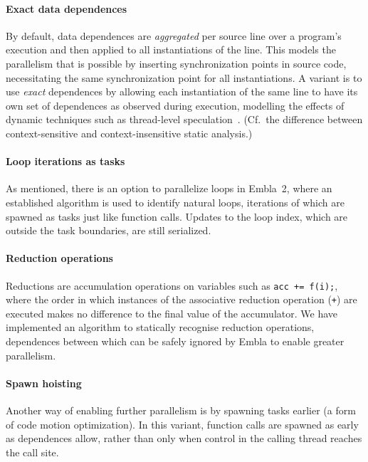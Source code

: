 \paragraph{Exact data dependences}
By default, data dependences are \emph{aggregated} per source line over a program's execution
and then applied to all instantiations of the line.
This models the parallelism that is possible by inserting synchronization points in source code,
necessitating the same synchronization point for all instantiations.
A variant is to use \emph{exact} dependences by allowing each instantiation of the same line to have its own set of dependences as observed during execution,
modelling the effects of dynamic techniques such as thread-level speculation~\cite{Rundberg01anall-software,gregory05stampede}.
(Cf.\ the difference between context-sensitive and context-insensitive static analysis.)

\paragraph{Loop iterations as tasks}
As mentioned, there is an option to parallelize loops in Embla~2,
where an established algorithm \cite{aho86compilers} is used to identify natural loops,
iterations of which are spawned as tasks just like function calls.
Updates to the loop index, which are outside the task boundaries, are still serialized.

\paragraph{Reduction operations}
Reductions are accumulation operations on variables such as \texttt{acc += f(i);},
where the order in which instances of the associative reduction operation ({\tt+})
are executed makes no difference to the final value of the accumulator.
We have implemented an algorithm to statically recognise reduction operations,
dependences between which can be safely ignored by Embla to enable greater parallelism.

\paragraph{Spawn hoisting}
Another way of enabling further parallelism is by spawning tasks earlier (a form of code motion optimization).
In this variant, function calls are spawned as early as dependences allow,
rather than only when control in the calling thread reaches the call site.

